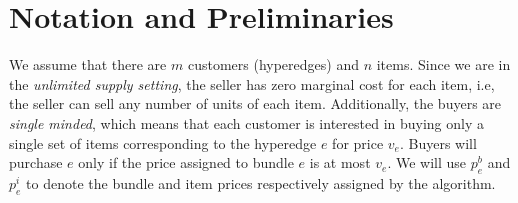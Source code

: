 
\section{Notation and Preliminaries}

We assume that there are $m$ customers (hyperedges) and $n$ items. Since we are in the {\em unlimited supply setting}, the seller has zero marginal cost  for each item, i.e, the seller can sell any number of units of each item. Additionally, the buyers are  {\em single minded}, which means that each customer is interested in buying only a single set of items corresponding to the hyperedge $e$ for price $v_e$. Buyers will purchase $e$ only if the price assigned to bundle $e$ is at most $v_e$. We will use $p^{b}_e$ and $p^{i}_e$ to denote the bundle and item prices respectively assigned by the algorithm. 